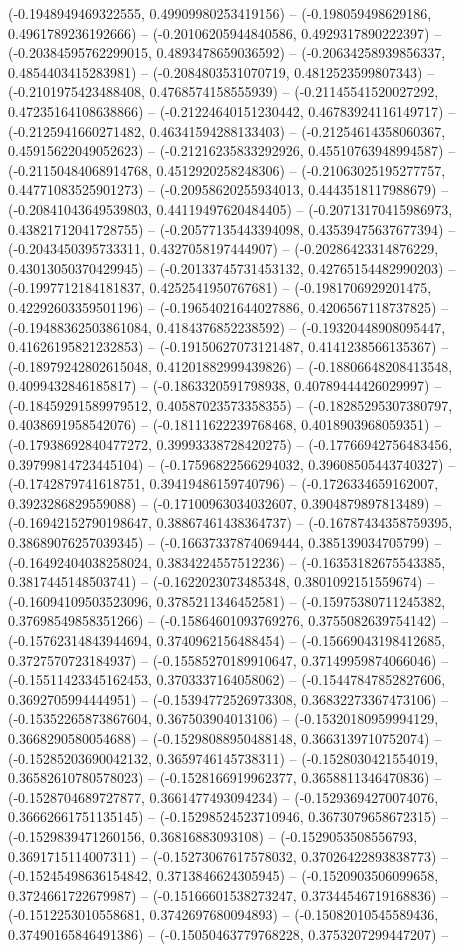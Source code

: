 (-0.1948949469322555, 0.49909980253419156) -- (-0.198059498629186, 0.4961789236192666) -- (-0.20106205944840586, 0.4929317890222397) -- (-0.20384595762299015, 0.4893478659036592) -- (-0.20634258939856337, 0.4854403415283981) -- (-0.2084803531070719, 0.4812523599807343) -- (-0.2101975423488408, 0.4768574158555939) -- (-0.21145541520027292, 0.47235164108638866) -- (-0.21224640151230442, 0.46783924116149717) -- (-0.2125941660271482, 0.46341594288133403) -- (-0.21254614358060367, 0.45915622049052623) -- (-0.21216235833292926, 0.45510763948994587) -- (-0.21150484068914768, 0.4512920258248306) -- (-0.21063025195277757, 0.44771083525901273) -- (-0.20958620255934013, 0.4443518117988679) -- (-0.20841043649539803, 0.44119497620484405) -- (-0.20713170415986973, 0.43821712041728755) -- (-0.20577135443394098, 0.43539475637677394) -- (-0.2043450395733311, 0.4327058197444907) -- (-0.20286423314876229, 0.43013050370429945) -- (-0.20133745731453132, 0.42765154482990203) -- (-0.1997712184181837, 0.4252541950767681) -- (-0.1981706929201475, 0.42292603359501196) -- (-0.19654021644027886, 0.4206567118737825) -- (-0.19488362503861084, 0.4184376852238592) -- (-0.19320448908095447, 0.41626195821232853) -- (-0.19150627073121487, 0.4141238566135367) -- (-0.18979242802615048, 0.41201882999439826) -- (-0.18806648208413548, 0.4099432846185817) -- (-0.1863320591798938, 0.40789444426029997) -- (-0.18459291589979512, 0.40587023573358355) -- (-0.18285295307380797, 0.4038691958542076) -- (-0.18111622239768468, 0.4018903968059351) -- (-0.17938692840477272, 0.39993338728420275) -- (-0.17766942756483456, 0.39799814723445104) -- (-0.17596822566294032, 0.39608505443740327) -- (-0.1742879741618751, 0.39419486159740796) -- (-0.1726334659162007, 0.3923286829559088) -- (-0.17100963034032607, 0.3904879897813489) -- (-0.16942152790198647, 0.38867461438364737) -- (-0.16787434358759395, 0.38689076257039345) -- (-0.16637337874069444, 0.385139034705799) -- (-0.16492404038258024, 0.3834224557512236) -- (-0.16353182675543385, 0.3817445148503741) -- (-0.1622023073485348, 0.3801092151559674) -- (-0.16094109503523096, 0.3785211346452581) -- (-0.15975380711245382, 0.37698549858351266) -- (-0.15864601093769276, 0.3755082639754142) -- (-0.15762314843944694, 0.3740962156488454) -- (-0.15669043198412685, 0.3727570723184937) -- (-0.15585270189910647, 0.37149959874066046) -- (-0.15511423345162453, 0.3703337164058062) -- (-0.15447847852827606, 0.3692705994444951) -- (-0.15394772526973308, 0.36832273367473106) -- (-0.15352265873867604, 0.367503904013106) -- (-0.15320180959994129, 0.3668290580054688) -- (-0.15298088950488148, 0.3663139710752074) -- (-0.15285203690042132, 0.3659746145738311) -- (-0.1528030421554019, 0.36582610780578023) -- (-0.1528166919962377, 0.3658811346470836) -- (-0.1528704689727877, 0.3661477493094234) -- (-0.15293694270074076, 0.36662661751135145) -- (-0.15298524523710946, 0.3673079658672315) -- (-0.1529839471260156, 0.36816883093108) -- (-0.1529053508556793, 0.3691715114007311) -- (-0.15273067617578032, 0.37026422893838773) -- (-0.15245498636154842, 0.3713846624305945) -- (-0.1520903506099658, 0.3724661722679987) -- (-0.15166601538273247, 0.37344546719168836) -- (-0.1512253010558681, 0.3742697680094893) -- (-0.15082010545589436, 0.37490165846491386) -- (-0.15050463779768228, 0.3753207299447207) -- 